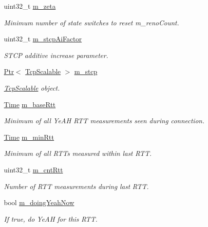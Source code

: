 \begin{DoxyCompactItemize}
uint32\+\_\+t \hyperlink{classns3_1_1TcpYeah_a03fb40380c411b1f33f4669907e1712b}{m\+\_\+zeta}
\begin{DoxyCompactList}\small\item\em Minimum number of state switches to reset m\+\_\+reno\+Count. \end{DoxyCompactList}\item 
uint32\+\_\+t \hyperlink{classns3_1_1TcpYeah_a9eab73e1bb55aa7664fb054973e75d49}{m\+\_\+stcp\+Ai\+Factor}
\begin{DoxyCompactList}\small\item\em S\+T\+CP additive increase parameter. \end{DoxyCompactList}\item 
\hyperlink{classns3_1_1Ptr}{Ptr}$<$ \hyperlink{classns3_1_1TcpScalable}{Tcp\+Scalable} $>$ \hyperlink{classns3_1_1TcpYeah_aa02909129f868dc1b58ade0efa826ff3}{m\+\_\+stcp}
\begin{DoxyCompactList}\small\item\em \hyperlink{classns3_1_1TcpScalable}{Tcp\+Scalable} object. \end{DoxyCompactList}\item 
\hyperlink{classns3_1_1Time}{Time} \hyperlink{classns3_1_1TcpYeah_ae5be5385c3024374ff24843e70cde080}{m\+\_\+base\+Rtt}
\begin{DoxyCompactList}\small\item\em Minimum of all Ye\+AH R\+TT measurements seen during connection. \end{DoxyCompactList}\item 
\hyperlink{classns3_1_1Time}{Time} \hyperlink{classns3_1_1TcpYeah_a03797ee01437476f042a2532916eeb34}{m\+\_\+min\+Rtt}
\begin{DoxyCompactList}\small\item\em Minimum of all R\+T\+Ts measured within last R\+TT. \end{DoxyCompactList}\item 
uint32\+\_\+t \hyperlink{classns3_1_1TcpYeah_a3040af9006b6237f1c5aa012aba3858a}{m\+\_\+cnt\+Rtt}
\begin{DoxyCompactList}\small\item\em Number of R\+TT measurements during last R\+TT. \end{DoxyCompactList}\item 
bool \hyperlink{classns3_1_1TcpYeah_a25cd1e84b0c21841c03a0c9b539f1006}{m\+\_\+doing\+Yeah\+Now}
\begin{DoxyCompactList}\small\item\em If true, do Ye\+AH for this R\+TT. \end{DoxyCompactList}\item 

\end{DoxyCompactItemize}
